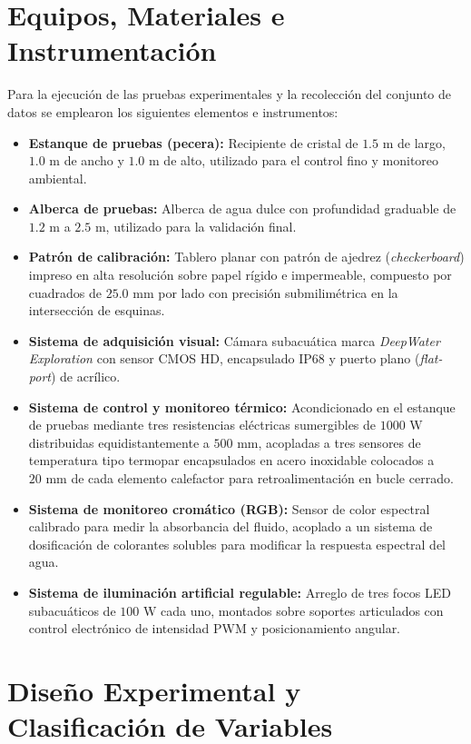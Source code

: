 \documentclass[12pt,letterpaper,spanish,twoside,openright]{report}
\begin{document}
\section{Equipos, Materiales e Instrumentación}

Para la ejecución de las pruebas experimentales y la recolección del conjunto de datos se emplearon los siguientes elementos e instrumentos:

\begin{itemize}
    \item \textbf{Estanque de pruebas (pecera):} Recipiente de cristal de $1.5\text{ m}$ de largo, $1.0\text{ m}$ de ancho y $1.0\text{ m}$ de alto, utilizado para el control fino y monitoreo ambiental.
    \item \textbf{Alberca de pruebas:} Alberca de agua dulce con profundidad graduable de $1.2\text{ m}$ a $2.5\text{ m}$, utilizado para la validación final.
    \item \textbf{Patrón de calibración:} Tablero planar con patrón de ajedrez (\textit{checkerboard}) impreso en alta resolución sobre papel rígido e impermeable, compuesto por cuadrados de $25.0\text{ mm}$ por lado con precisión submilimétrica en la intersección de esquinas.
    \item \textbf{Sistema de adquisición visual:} Cámara subacuática marca \textit{DeepWater Exploration} con sensor CMOS HD, encapsulado IP68 y puerto plano (\textit{flat-port}) de acrílico.
    \item \textbf{Sistema de control y monitoreo térmico:} Acondicionado en el estanque de pruebas mediante tres resistencias eléctricas sumergibles de $1000\text{ W}$ distribuidas equidistantemente a $500\text{ mm}$, acopladas a tres sensores de temperatura tipo termopar encapsulados en acero inoxidable colocados a $20\text{ mm}$ de cada elemento calefactor para retroalimentación en bucle cerrado.
    \item \textbf{Sistema de monitoreo cromático (RGB):} Sensor de color espectral calibrado para medir la absorbancia del fluido, acoplado a un sistema de dosificación de colorantes solubles para modificar la respuesta espectral del agua.
    \item \textbf{Sistema de iluminación artificial regulable:} Arreglo de tres focos LED subacuáticos de $100\text{ W}$ cada uno, montados sobre soportes articulados con control electrónico de intensidad PWM y posicionamiento angular.
\end{itemize}

\section{Diseño Experimental y Clasificación de Variables}
\end{document}
